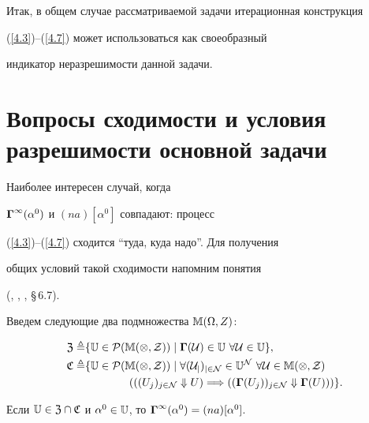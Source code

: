 Итак, в общем случае рассматриваемой задачи итерационная конструкция


(\ref{4.3})--(\ref{4.7}) может использоваться как своеобразный


индикатор неразрешимости данной задачи.








\section{Вопросы сходимости и условия разрешимости основной задачи}





Наиболее интересен случай, когда


${{\boldsymbol\Gamma}^\infty}({\alpha}^0)$ и $(na)[{\alpha}^0]$ совпадают: процесс


(\ref{4.3})--(\ref{4.7}) сходится ``туда, куда надо''. Для получения


общих условий такой сходимости напомним понятия


(\cite{25}, \cite{26}, \cite{55}, \S\,6.7).


Введем следующие два подмножества $\Bbb{M}(\Omega,Z)$:


\begin{align}\label{5.1}


{\frak Z} \triangleq &\{\Bbb{U} \in \cal{P}(\Bbb{M}(\Om,Z)) \mid


{\mG}(U) \in \Bbb{U} \ \fo{U} \in \Bbb{U}\}, \\


%


{\frak C} \triangleq &\{\Bbb{U} \in \cal{P}(\Bbb{M}(\Om,Z)) \mid


\fo{(U_j)_{j \in \cal{N}}} \in {\Bbb{U}}^{\cal{N}} \ \fo{U}


\in \Bbb{M}(\Om,Z)\notag \\


\label{5.2}


&\qquad \qquad {}(({(U_j)_{j \in \cal{N}}} \Dow


U) \Lo ({({\mG}(U_j))_{j \in \cal{N}}} \Dow {\mG}(U)))\}.


\end{align}








\begin{props}


Если $\Bbb{U} \in {\frak Z} \cap {\frak C}$ и ${\alpha}^0 \in


\Bbb{U}$, то ${{\mG}^\infty}({\alpha}^0) = (na)[{\alpha}^0]$.


\end{props}








